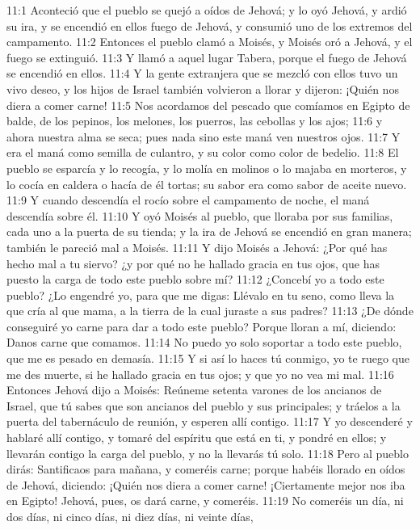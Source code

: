 11:1 Aconteció que el pueblo se quejó a oídos de Jehová; y lo oyó Jehová, y ardió su ira, y se encendió en ellos fuego de Jehová, y consumió uno de los extremos del campamento.  
11:2 Entonces el pueblo clamó a Moisés, y Moisés oró a Jehová, y el fuego se extinguió.  
11:3 Y llamó a aquel lugar Tabera, porque el fuego de Jehová se encendió en ellos.  
11:4 Y la gente extranjera que se mezcló con ellos tuvo un vivo deseo, y los hijos de Israel también volvieron a llorar y dijeron: ¡Quién nos diera a comer carne!  
11:5 Nos acordamos del pescado que comíamos en Egipto de balde, de los pepinos, los melones, los puerros, las cebollas y los ajos;  
11:6 y ahora nuestra alma se seca; pues nada sino este maná ven nuestros ojos.  
11:7 Y era el maná como semilla de culantro, y su color como color de bedelio.  
11:8 El pueblo se esparcía y lo recogía, y lo molía en molinos o lo majaba en morteros, y lo cocía en caldera o hacía de él tortas; su sabor era como sabor de aceite nuevo.  
11:9 Y cuando descendía el rocío sobre el campamento de noche, el maná descendía sobre él.  
11:10 Y oyó Moisés al pueblo, que lloraba por sus familias, cada uno a la puerta de su tienda; y la ira de Jehová se encendió en gran manera; también le pareció mal a Moisés.  
11:11 Y dijo Moisés a Jehová: ¿Por qué has hecho mal a tu siervo? ¿y por qué no he hallado gracia en tus ojos, que has puesto la carga de todo este pueblo sobre mí?  
11:12 ¿Concebí yo a todo este pueblo? ¿Lo engendré yo, para que me digas: Llévalo en tu seno, como lleva la que cría al que mama, a la tierra de la cual juraste a sus padres?  
11:13 ¿De dónde conseguiré yo carne para dar a todo este pueblo? Porque lloran a mí, diciendo: Danos carne que comamos.  
11:14 No puedo yo solo soportar a todo este pueblo, que me es pesado en demasía.  
11:15 Y si así lo haces tú conmigo, yo te ruego que me des muerte, si he hallado gracia en tus ojos; y que yo no vea mi mal.  
11:16 Entonces Jehová dijo a Moisés: Reúneme setenta varones de los ancianos de Israel, que tú sabes que son ancianos del pueblo y sus principales; y tráelos a la puerta del tabernáculo de reunión, y esperen allí contigo.  
11:17 Y yo descenderé y hablaré allí contigo, y tomaré del espíritu que está en ti, y pondré en ellos; y llevarán contigo la carga del pueblo, y no la llevarás tú solo.  
11:18 Pero al pueblo dirás: Santificaos para mañana, y comeréis carne; porque habéis llorado en oídos de Jehová, diciendo: ¡Quién nos diera a comer carne! ¡Ciertamente mejor nos iba en Egipto! Jehová, pues, os dará carne, y comeréis.  
11:19 No comeréis un día, ni dos días, ni cinco días, ni diez días, ni veinte días,  
